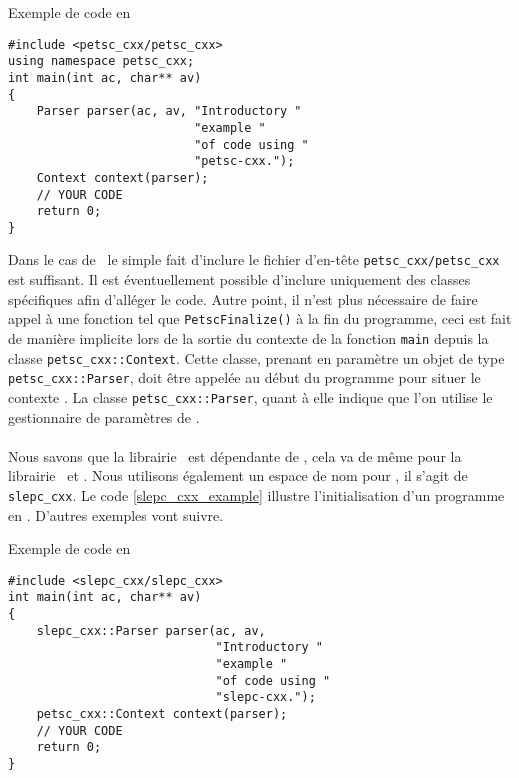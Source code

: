 \begin{algorithm}[h]
  \caption{Exemple de code en \petscx}
  \label{petsc_cxx_example}
\begin{verbatim}
#include <petsc_cxx/petsc_cxx>
using namespace petsc_cxx;
int main(int ac, char** av)
{
    Parser parser(ac, av, "Introductory "
                          "example "
                          "of code using "
                          "petsc-cxx.");
    Context context(parser);
    // YOUR CODE
    return 0;
}
\end{verbatim}
\end{algorithm}

Dans le cas de \petscx\ le simple fait d'inclure le fichier d'en-tête \verb#petsc_cxx/petsc_cxx# est suffisant. Il est éventuellement possible d'inclure uniquement des classes spécifiques afin d'alléger le code. Autre point, il n'est plus nécessaire de faire appel à une fonction tel que \verb#PetscFinalize()# à la fin du programme, ceci est fait de manière implicite lors de la sortie du contexte de la fonction \verb#main# depuis la classe \verb#petsc_cxx::Context#. Cette classe, prenant en paramètre un objet de type \verb#petsc_cxx::Parser#, doit être appelée au début du programme pour situer le contexte \petsc. La classe \verb#petsc_cxx::Parser#, quant à elle indique que l'on utilise le gestionnaire de paramètres de \petsc.

\paragraph{\slepcx}

Nous savons que la librairie \slepc\ est dépendante de \petsc, cela va de même pour la librairie \slepcx\ et \petscx. Nous utilisons également un espace de nom pour \slepcx, il s'agit de \verb#slepc_cxx#. Le code \ref{slepc_cxx_example} illustre l'initialisation d'un programme en \slepcx. D'autres exemples vont suivre.

\begin{algorithm}[h]
  \caption{Exemple de code en \slepcx}
  \label{slepc_cxx_example}
\begin{verbatim}
#include <slepc_cxx/slepc_cxx>
int main(int ac, char** av)
{
    slepc_cxx::Parser parser(ac, av,
                             "Introductory "
                             "example "
                             "of code using "
                             "slepc-cxx.");
    petsc_cxx::Context context(parser);
    // YOUR CODE
    return 0;
}
\end{verbatim}
\end{algorithm}

